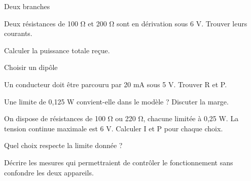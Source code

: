 \par\noindent\begin{minipage}{\linewidth}
\begin{exercice}[3]{Deux branches}
\begin{questions}
\item Deux résistances de 100 Ω et 200 Ω sont en dérivation sous 6 V. Trouver leurs courants.
\item Calculer la puissance totale reçue.
\end{questions}
\end{exercice}
\end{minipage}
\par\noindent\begin{minipage}{\linewidth}
\begin{exercice}[3]{Choisir un dipôle}
\begin{questions}
\item Un conducteur doit être parcouru par 20 mA sous 5 V. Trouver R et P.
\item Une limite de 0,125 W convient-elle dans le modèle ? Discuter la marge.
\end{questions}
\end{exercice}
\end{minipage}
\label{defi-ex-14}
\begin{questions}
\item On dispose de résistances de 100 Ω ou 220 Ω, chacune limitée à 0,25 W. La tension continue maximale est 6 V. Calculer I et P pour chaque choix.
\item Quel choix respecte la limite donnée ?
\item Décrire les mesures qui permettraient de contrôler le fonctionnement sans confondre les deux appareils.
\end{questions}
\pcGrille
